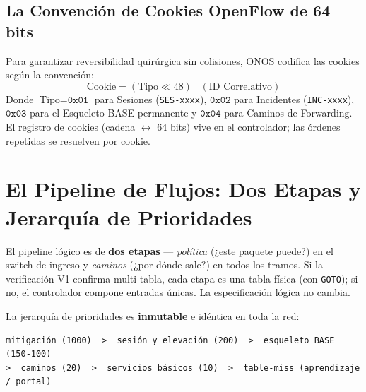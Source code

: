 \documentclass[11pt,a4paper]{report}
\begin{document}
\subsection{La Convención de Cookies OpenFlow de 64 bits}
Para garantizar reversibilidad quirúrgica sin colisiones, ONOS codifica las cookies según la convención:
\begin{equation}
\text{Cookie} = (\text{Tipo} \ll 48) \mid (\text{ID Correlativo})
\end{equation}
Donde $\text{Tipo} = \texttt{0x01}$ para Sesiones (\texttt{SES-xxxx}), $\texttt{0x02}$ para Incidentes (\texttt{INC-xxxx}), $\texttt{0x03}$ para el Esqueleto BASE permanente y $\texttt{0x04}$ para Caminos de Forwarding. El registro de cookies (cadena $\leftrightarrow$ 64 bits) vive en el controlador; las órdenes repetidas se resuelven por cookie.

\section{El Pipeline de Flujos: Dos Etapas y Jerarquía de Prioridades}
El pipeline lógico es de \textbf{dos etapas} — \emph{política} (¿este paquete puede?) en el switch de ingreso y \emph{caminos} (¿por dónde sale?) en todos los tramos. Si la verificación V1 confirma multi-tabla, cada etapa es una tabla física (con \texttt{GOTO}); si no, el controlador compone entradas únicas. La especificación lógica no cambia.

La jerarquía de prioridades es \textbf{inmutable} e idéntica en toda la red:

\begin{verbatim}
mitigación (1000)  >  sesión y elevación (200)  >  esqueleto BASE (150-100)
>  caminos (20)  >  servicios básicos (10)  >  table-miss (aprendizaje / portal)
\end{verbatim}
\end{document}
